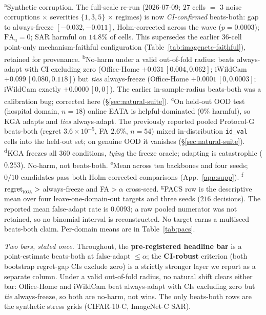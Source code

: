 \documentclass[conference]{IEEEtran}
\theoremstyle{plain}
\theoremstyle{definition}
\begin{document}
\begin{table}[t]
{\footnotesize\raggedright
\textsuperscript{a}Synthetic corruption. The full-scale re-run (2026-07-09; $27$ cells $=$ 3 noise
corruptions $\times$ severities $\{1,3,5\}$ $\times$ regimes) is now \emph{CI-confirmed} beats-both:
gap to always-freeze $[-0.032,-0.011]$, Holm-corrected across the wave ($p{=}0.0003$);
$\mathrm{FA}_{\mathrm u}=0$; SAR harmful on $14.8\%$ of cells. This supersedes the earlier $36$-cell
point-only mechanism-faithful configuration (Table~\ref{tab:imagenetc-faithful}), retained for
provenance.\quad
\textsuperscript{b}No-harm under a valid out-of-fold radius: beats always-adapt with CI excluding
zero (Office-Home $+0.031\,[0.004,0.062]$; iWildCam $+0.099\,[0.080,0.118]$) but \emph{ties}
always-freeze (Office-Home $+0.0001\,[0,0.0003]$; iWildCam exactly $+0.0000\,[0,0]$). The earlier
in-sample-radius beats-both was a calibration bug; corrected here (\S\ref{sec:natural-suite}).\quad
\textsuperscript{c}On held-out OOD test (hospital domain, $n{=}18$) online EATA is
helpful-dominated ($0\%$ harmful), so \textsc{KGA} adapts and \emph{ties} always-adapt. The
previously reported pooled Protocol-G beats-both (regret $3.6{\times}10^{-5}$, FA $2.6\%$,
$n{=}54$) mixed in-distribution \texttt{id\_val} cells into the held-out set; on genuine OOD it
vanishes (\S\ref{sec:natural-suite}).\quad
\textsuperscript{d}\textsc{KGA} freezes all $360$ conditions, \emph{tying} the freeze oracle;
adapting is catastrophic ($0.253$). No-harm, not beats-both.\quad
\textsuperscript{e}Mean across ten backbones and four seeds; $0/10$ candidates pass both Holm-corrected comparisons (App.~\ref{app:supp}).\quad
\textsuperscript{f}$\mathrm{regret}_{\textsc{kga}}>$ always-freeze and FA${>}\alpha$ cross-seed.\quad
\textsuperscript{g}PACS row is the descriptive mean over four leave-one-domain-out targets and three seeds ($216$ decisions). The reported mean false-adapt rate is $0.0093$; a raw pooled numerator was not retained, so no binomial interval is reconstructed. No target earns a multiseed beats-both claim. Per-domain means are in Table~\ref{tab:pacs}.\par}
\end{table}

\noindent\emph{Two bars, stated once.} Throughout, the \textbf{pre-registered headline bar} is a
point-estimate beats-both at false-adapt $\le\alpha$; the \textbf{CI-robust} criterion
(both bootstrap regret-gap CIs exclude zero) is a strictly stronger layer we report as a separate
column. Under a valid out-of-fold radius, no natural shift clears either bar: Office-Home and
iWildCam beat always-adapt with CIs excluding zero but \emph{tie} always-freeze, so both are
no-harm, not wins. The only beats-both rows are the synthetic stress grids (CIFAR-10-C, ImageNet-C
SAR).
\end{document}
